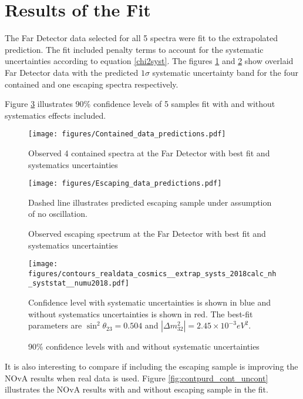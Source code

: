 \clearpage
\section{Results of the Fit}
The Far Detector data selected for all 5 spectra were fit to the extrapolated prediction. The fit included penalty terms to 
account for the systematic uncertainties according to equation \ref{chi2syst}. The figures \ref{fig:dataprediction_cont}
and \ref{fig:dataprediction_uncont} show overlaid Far Detector data with the predicted $1\sigma$ systematic uncertainty band
for the four contained and one escaping spectra respectively.  

Figure \ref{fig:cant_w_wo_syst} illustrates 90\% confidence levels of 5 samples fit with and without systematics effects 
included. 

\begin{figure}[!th]
\centering
\texttt{[image: figures/Contained\_data\_predictions.pdf]}
\caption{Observed 4 contained spectra at the Far Detector with best fit and systematics uncertainties}
{}
\label{fig:dataprediction_cont}
\end{figure}

\begin{figure}[!th]
\centering
\texttt{[image: figures/Escaping\_data\_predictions.pdf]}
\caption{Observed escaping spectrum at the Far Detector with best fit and systematics uncertainties}
{Dashed line illustrates predicted escaping sample under assumption of no oscillation. }
\label{fig:dataprediction_uncont}
\end{figure}

\begin{figure}[!th]
\centering
\texttt{[image: figures/contours\_realdata\_cosmics\_\_extrap\_systs\_2018calc\_nh\_syststat\_\_numu2018.pdf]}
\caption{90\% confidence levels with and without systematic uncertainties}
{Confidence level with systematic uncertainties is shown in blue and without systematics uncertainties is shown in red. 
The best-fit parameters are $\sin^2\theta_{23} = 0.504$ and $|\Delta m^2_{32}| = 2.45\times 10^{-3} eV^2$.}
\label{fig:cant_w_wo_syst}
\end{figure}

It is also interesting to compare if including the escaping sample is improving the NOvA results when real data is used.
Figure \ref{fig:contpurd_cont_uncont} illustrates the NOvA results with and without escaping sample in the fit. 


